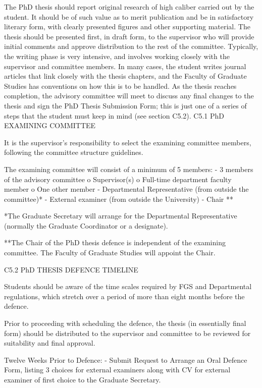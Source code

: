 \documentclass{article}
\begin{document}
The PhD thesis should report original research of high caliber carried out by the student. It should be of such value as to merit publication and be in satisfactory literary form, with clearly presented figures and other supporting material. The thesis should be presented first, in draft form, to the supervisor who will provide initial comments and approve distribution to the rest of the committee. Typically, the writing phase is very intensive, and involves working closely with the supervisor and committee members. In many cases, the student writes journal articles that link closely with the thesis chapters, and the Faculty of Graduate Studies has conventions on how this is to be handled. As the thesis reaches completion, the advisory committee will meet to discuss any final changes to the thesis and sign the PhD Thesis Submission Form; this is just one of a series of steps that the student must keep in mind (see section C5.2).
C5.1	PhD EXAMINING COMMITTEE
 

It is the supervisor’s responsibility to select the examining committee members, following the committee structure guidelines.

The examining committee will consist of a minimum of 5 members:
-	3 members of the advisory committee
o	Supervisor(s)
o	Full-time department faculty member
o	One other member
-	Departmental Representative (from outside the committee)*
-	External examiner (from outside the University)
-	Chair **

*The Graduate Secretary will arrange for the Departmental Representative (normally the Graduate Coordinator or a designate).

**The Chair of the PhD thesis defence is independent of the examining committee. The Faculty of Graduate Studies will appoint the Chair.

C5.2	PhD THESIS DEFENCE TIMELINE

Students should be aware of the time scales required by FGS and Departmental regulations, which stretch over a period of more than eight months before the defence.

Prior to proceeding with scheduling the defence, the thesis (in essentially final form) should be distributed to the supervisor and committee to be reviewed for suitability and final approval.

Twelve Weeks Prior to Defence:
-	Submit Request to Arrange an Oral Defence Form, listing 3 choices for external examiners along with CV for external examiner of first choice to the Graduate Secretary.
\end{document}
